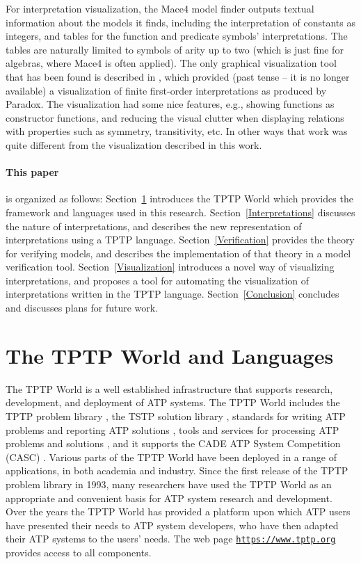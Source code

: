 \documentclass{easychair}
\newcommand{\smalltt}[1]{\small \texttt{#1}}
\begin{document}
For interpretation visualization, the Mace4 model finder \cite{McC03-MACE4-TR} outputs textual 
information about the models it finds, including the interpretation of constants as integers,
and tables for the function and predicate symbols' interpretations. 
The tables are naturally limited to symbols of arity up to two (which is just fine for algebras, 
where Mace4 is often applied).
The only graphical visualization tool that has been found is described in \cite{Sch13-MS},
which provided (past tense -- it is no longer available) a visualization of finite first-order 
interpretations as produced by Paradox.
The visualization had some nice features, e.g., showing functions as constructor functions, and 
reducing the visual clutter when displaying relations with properties such as symmetry, 
transitivity, etc.
In other ways that work was quite different from the visualization described in this work.

\paragraph{This paper} is organized as follows:
Section~\ref{TPTP} introduces the TPTP World which provides the framework and languages used
in this research.
Section~\ref{Interpretations} discusses the nature of interpretations, and describes the new 
representation of interpretations using a TPTP language.
Section~\ref{Verification} provides the theory for verifying models, and describes the
implementation of that theory in a model verification tool.
Section~\ref{Visualization} introduces a novel way of visualizing interpretations, and
proposes a tool for automating the visualization of interpretations written in the TPTP language.
Section~\ref{Conclusion} concludes and discusses plans for future work.

\section{The TPTP World and Languages}
\label{TPTP}

The TPTP World \cite{Sut17} is a well established infrastructure that supports research, 
development, and deployment of ATP systems.
The TPTP World includes the TPTP problem library
\cite{Sut09}, 
the TSTP solution library
\cite{Sut10}, 
standards for writing ATP problems and reporting ATP solutions
\cite{SS+06,Sut08-KEAPPA}, 
tools and services for processing ATP problems and solutions
\cite{Sut10}, 
and it supports the CADE ATP System Competition (CASC)
\cite{Sut16}.
Various parts of the TPTP World have been deployed in a range of applications,
in both academia and industry.
Since the first release of the TPTP problem library in 1993, many researchers have used the 
TPTP World as an appropriate and convenient basis for ATP system research and development. 
Over the years the TPTP World has provided a platform upon which ATP users have presented their 
needs to ATP system developers, who have then adapted their ATP systems to the users’ needs.
The web page {\smalltt{\url{https://www.tptp.org}}} provides access to all components.
\end{document}
